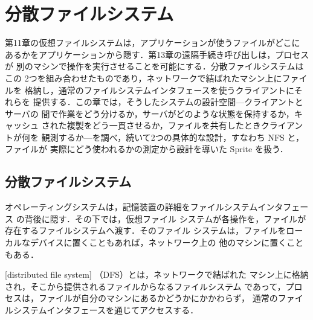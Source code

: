 \documentclass[../main.tex]{subfiles}
\begin{document}
\chapter{分散ファイルシステム}

第11章の仮想ファイルシステムは，アプリケーションが使うファイルがどこに
あるかをアプリケーションから隠す．第13章の遠隔手続き呼び出しは，プロセスが
別のマシンで操作を実行させることを可能にする．分散ファイルシステムはこの
2つを組み合わせたものであり，ネットワークで結ばれたマシン上にファイルを
格納し，通常のファイルシステムインタフェースを使うクライアントにそれらを
提供する．この章では，そうしたシステムの設計空間---クライアントとサーバの
間で作業をどう分けるか，サーバがどのような状態を保持するか，キャッシュ
された複製をどう一貫させるか，ファイルを共有したときクライアントが何を
観測するか---を調べ，続いて2つの具体的な設計，すなわち NFS と，ファイルが
実際にどう使われるかの測定から設計を導いた Sprite を扱う．

\section{分散ファイルシステム}
\label{sec:l14-dfs}

オペレーティングシステムは，記憶装置の詳細をファイルシステムインタフェース
の背後に隠す．その下では，仮想ファイル
システムが各操作を，ファイルが存在するファイルシステムへ渡す．そのファイル
システムは，ファイルをローカルなデバイスに置くこともあれば，ネットワーク上の
他のマシンに置くこともある．

\begin{definition}[分散ファイルシステム]
  [distributed file system]%
  （DFS）とは，ネットワークで結ばれた
  マシン上に格納され，そこから提供されるファイルからなるファイルシステム
  であって，プロセスは，ファイルが自分のマシンにあるかどうかにかかわらず，
  通常のファイルシステムインタフェースを通じてアクセスする．
\end{definition}
\end{document}
